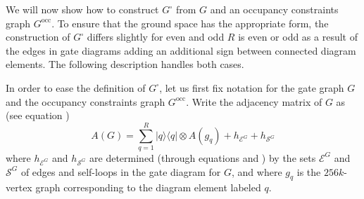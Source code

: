 \documentclass[../thesis-main/thesis-main]{subfiles}
\begin{document}
We will now show how to construct $G^{\square}$ from $G$ and an occupancy constraints graph $G^{\text{occ}}$.  To ensure that the ground space has the appropriate form, the construction of $G^{\square}$ differs slightly for even and odd $R$ is even or odd as a result of the edges in gate diagrams adding an additional sign between connected diagram elements.  The following description handles both cases.

In order to ease the definition of $G^{\square}$, let us first fix notation for the gate graph $G$ and the occupancy constraints graph $G^{\text{occ}}$. Write the adjacency matrix of $G$ as (see equation ) 
\begin{equation}
A(G)=\sum_{q=1}^{R}|q\rangle\langle q|\otimes A(g_{q})+h_{\mathcal{E}^{G}}+h_{\mathcal{S}^{G}}
\end{equation}
where $h_{\mathcal{E}^{G}}$ and $h_{\mathcal{S}^{G}}$ are determined (through equations  and ) by the sets $\mathcal{E}^{G}$ and $\mathcal{S}^{G}$ of edges and self-loops in the gate diagram for $G$, and where $g_q$ is the $256k$-vertex graph corresponding to the diagram element labeled $q$.
\end{document}

